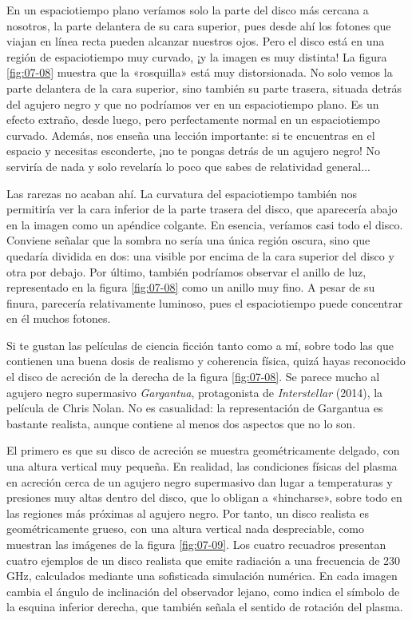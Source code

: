 En un espaciotiempo plano veríamos solo la parte del disco más cercana a nosotros, la parte delantera de su cara superior, pues desde ahí los fotones que viajan en línea recta pueden alcanzar nuestros ojos. Pero el disco está en una región de espaciotiempo muy curvado, ¡y la imagen es muy distinta! La figura \ref{fig:07-08} muestra que la «rosquilla» está muy distorsionada. No solo vemos la parte delantera de la cara superior, sino también su parte trasera, situada detrás del agujero negro y que no podríamos ver en un espaciotiempo plano. Es un efecto extraño, desde luego, pero perfectamente normal en un espaciotiempo curvado. Además, nos enseña una lección importante: si te encuentras en el espacio y necesitas esconderte, ¡no te pongas detrás de un agujero negro! No serviría de nada y solo revelaría lo poco que sabes de relatividad general...

Las rarezas no acaban ahí. La curvatura del espaciotiempo también nos permitiría ver la cara inferior de la parte trasera del disco, que aparecería abajo en la imagen como un apéndice colgante. En esencia, veríamos casi todo el disco. Conviene señalar que la sombra no sería una única región oscura, sino que quedaría dividida en dos: una visible por encima de la cara superior del disco y otra por debajo. Por último, también podríamos observar el anillo de luz, representado en la figura \ref{fig:07-08} como un anillo muy fino. A pesar de su finura, parecería relativamente luminoso, pues el espaciotiempo puede concentrar en él muchos fotones.

Si te gustan las películas de ciencia ficción tanto como a mí, sobre todo las que contienen una buena dosis de realismo y coherencia física, quizá hayas reconocido el disco de acreción de la derecha de la figura \ref{fig:07-08}. Se parece mucho al agujero negro supermasivo \emph{Gargantua}, protagonista de \emph{Interstellar} (2014), la película de Chris Nolan. No es casualidad: la representación de Gargantua es bastante realista, aunque contiene al menos dos aspectos que no lo son.

El primero es que su disco de acreción se muestra geométricamente delgado, con una altura vertical muy pequeña. En realidad, las condiciones físicas del plasma en acreción cerca de un agujero negro supermasivo dan lugar a temperaturas y presiones muy altas dentro del disco, que lo obligan a «hincharse», sobre todo en las regiones más próximas al agujero negro. Por tanto, un disco realista es geométricamente grueso, con una altura vertical nada despreciable, como muestran las imágenes de la figura \ref{fig:07-09}. Los cuatro recuadros presentan cuatro ejemplos de un disco realista que emite radiación a una frecuencia de 230 GHz, calculados mediante una sofisticada simulación numérica. En cada imagen cambia el ángulo de inclinación del observador lejano, como indica el símbolo de la esquina inferior derecha, que también señala el sentido de rotación del plasma.

